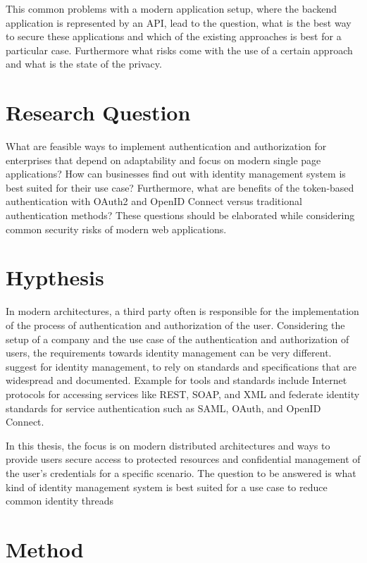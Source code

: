 This common problems with a modern application setup, where the backend application is represented by an API, lead to the question, what is the best way to secure these applications and which of the existing approaches is best for a particular case. Furthermore what risks come with the use of a certain approach and what is the state of the privacy.  


\section{Research Question}

What are feasible ways to implement authentication and authorization for enterprises that depend on adaptability and focus on modern single page applications? How can businesses find out with identity management system is best suited for their use case? Furthermore, what are benefits of the token-based authentication with OAuth2 and OpenID Connect versus traditional authentication methods? These questions should be elaborated while considering common security risks of modern web applications.

\section{Hypthesis}

In modern architectures, a third party often is responsible for the implementation of the process of authentication and authorization of the user. Considering the setup of a company and the use case of the authentication and authorization of users, the requirements towards identity management can be very different. \cite{NIST:2017:DIG} suggest for identity management, to rely on standards and specifications that are widespread and documented. Example for tools and standards include Internet protocols for accessing services like REST, SOAP, and XML and federate identity standards for service authentication such as SAML, OAuth, and OpenID Connect.

In this thesis, the focus is on modern distributed architectures and ways to provide users secure access to protected resources and confidential management of the user’s credentials for a specific scenario. The question to be answered is what kind of identity management system is best suited for a use case to reduce common identity threads 


\section{Method}

